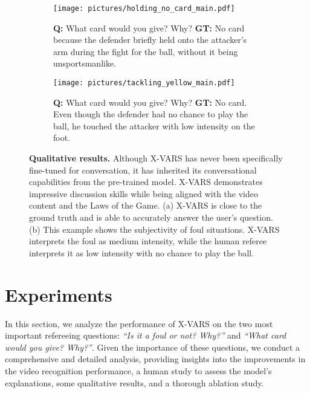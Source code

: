 \begin{figure*}
    \centering
    \begin{subfigure}[t]{0.49\textwidth}
        \centering
        \texttt{[image: pictures/holding\_no\_card\_main.pdf]}
        \caption{\textbf{Q:} What card would you give? Why? \textbf{GT:} No card because the defender briefly held onto the attacker's arm during the fight for the ball, without it being unsportsmanlike.
        }
        \label{fig:qualitative_res_a}
    \end{subfigure}
    \hfill
    \begin{subfigure}[t]{0.49\textwidth}
        \centering
        \texttt{[image: pictures/tackling\_yellow\_main.pdf]}
        \caption{\textbf{Q:} What card would you give? Why? \textbf{GT:}  No card. Even though the defender had no chance to play the ball, he touched the attacker with low intensity on the foot.}
        \label{fig:qualitative_res_b}
    \end{subfigure}
    \caption{
\textbf{Qualitative results.}
Although X-VARS has never been specifically fine-tuned for conversation, it has inherited its conversational capabilities from the pre-trained model. X-VARS demonstrates impressive discussion skills while being aligned with the video content and the Laws of the Game.
(a) X-VARS is close to the ground truth and is able to accurately answer the user's question.
(b) This example shows the subjectivity of foul situations. X-VARS interprets the foul as medium intensity, while the human referee interprets it as low intensity with no chance to play the ball.
}
    \label{fig:qualitative}
\end{figure*}

\section{Experiments} \label{sec:benchmarks}

In this section, we analyze the performance of X-VARS on the two most important refereeing questions: \textit{``Is it a foul or not? Why?''} and \textit{``What card would you give? Why?''}. Given the importance of these questions, we conduct a comprehensive and detailed analysis, providing insights into the improvements in the video recognition performance, a human study to assess the model's explanations, some qualitative results, and a thorough ablation study. 


